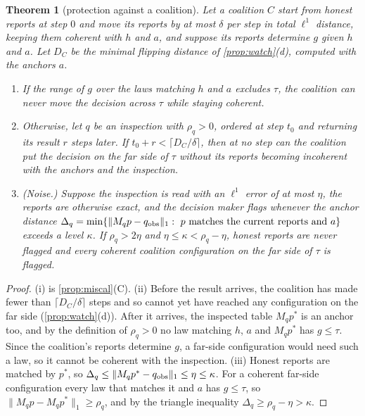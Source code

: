 \documentclass[11pt]{article}
\newtheorem{theorem}{Theorem}\newtheorem{proposition}[theorem]{Proposition}\newtheorem{lemma}[theorem]{Lemma}\newtheorem{corollary}[theorem]{Corollary}\newtheorem{conjecture}[theorem]{Conjecture}\crefname{conjecture}{Conjecture}{Conjectures}
\theoremstyle{definition}\newtheorem{definition}[theorem]{Definition}\newtheorem{remark}[theorem]{Remark}\newtheorem{example}[theorem]{Example}\newtheorem{problem}[theorem]{Open problem}\crefname{problem}{Problem}{Problems}
\begin{document}
\begin{theorem}[protection against a coalition]\label{thm:protect}
Let a coalition $C$ start from honest reports at step $0$ and move its reports by at most $\delta$ per step in total $\ell^1$ distance, keeping them coherent with $h$ and $a$, and suppose its reports determine $g$ given $h$ and $a$. Let $D_C$ be the minimal flipping distance of \cref{prop:watch}(d), computed with the anchors $a$.
\begin{enumerate}
\item[(i)] If the range of $g$ over the laws matching $h$ and $a$ excludes $\tau$, the coalition can never move the decision across $\tau$ while staying coherent.
\item[(ii)] Otherwise, let $q$ be an inspection with $\rho_q>0$, ordered at step $t_0$ and returning its result $r$ steps later. If $t_0+r<\lceil D_C/\delta\rceil$, then at no step can the coalition put the decision on the far side of $\tau$ without its reports becoming incoherent with the anchors and the inspection.
\item[(iii)] (Noise.) Suppose the inspection is read with an $\ell^1$ error of at most $\eta$, the reports are otherwise exact, and the decision maker flags whenever the anchor distance $\Delta_q=\min\{\|M_qp-q_{\rm obs}\|_1:\ p\ \text{matches the current reports and}\ a\}$ exceeds a level $\kappa$. If $\rho_q>2\eta$ and $\eta\le\kappa<\rho_q-\eta$, honest reports are never flagged and every coherent coalition configuration on the far side of $\tau$ is flagged.
\end{enumerate}
\end{theorem}

\begin{proof}
(i) is \cref{prop:miscal}(C). (ii) Before the result arrives, the coalition has made fewer than $\lceil D_C/\delta\rceil$ steps and so cannot yet have reached any configuration on the far side (\cref{prop:watch}(d)). After it arrives, the inspected table $M_qp^\ast$ is an anchor too, and by the definition of $\rho_q>0$ no law matching $h$, $a$ and $M_qp^\ast$ has $g\le\tau$. Since the coalition's reports determine $g$, a far-side configuration would need such a law, so it cannot be coherent with the inspection. (iii) Honest reports are matched by $p^\ast$, so $\Delta_q\le\|M_qp^\ast-q_{\rm obs}\|_1\le\eta\le\kappa$. For a coherent far-side configuration every law that matches it and $a$ has $g\le\tau$, so $\|M_qp-M_qp^\ast\|_1\ge\rho_q$, and by the triangle inequality $\Delta_q\ge\rho_q-\eta>\kappa$.
\end{proof}
\end{document}
